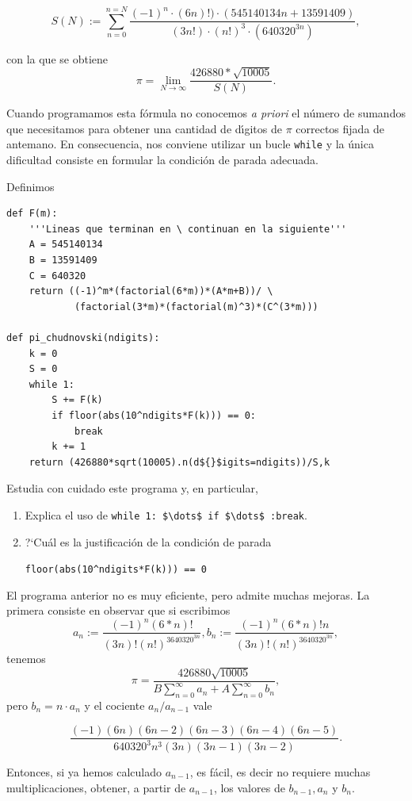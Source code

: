 \[S(N):=\sum_{n=0}^{n=N}\frac{(-1)^n\cdot (6n)!)\cdot
(545140134n+13591409)}{(3n!)\cdot (n!)^3\cdot (640320^{3n})},\]

\noindent con la que se obtiene 
\[\pi= \lim_{N\to \infty}\frac{426880*\sqrt{10005}}{S(N)}.\]

Cuando programamos esta f\'ormula no conocemos {\itshape a priori} el n\'umero
de sumandos que necesitamos para obtener una cantidad de d\'{\i}gitos de $\pi$
correctos fijada de antemano. En consecuencia, nos conviene utilizar un bucle
{\tt while} y la \'unica dificultad consiste en formular la condici\'on de
parada adecuada. 


Definimos

\begin{lstlisting}
def F(m):
	'''Lineas que terminan en \ continuan en la siguiente'''
    A = 545140134
    B = 13591409
    C = 640320
    return ((-1)^m*(factorial(6*m))*(A*m+B))/ \
		    (factorial(3*m)*(factorial(m)^3)*(C^(3*m)))
 
def pi_chudnovski(ndigits):
    k = 0
    S = 0 
    while 1:
        S += F(k)
        if floor(abs(10^ndigits*F(k))) == 0:
            break
        k += 1
    return (426880*sqrt(10005).n(d${}$igits=ndigits))/S,k
\end{lstlisting}

Estudia con cuidado este programa y, en particular, 
\begin{enumerate}
	\item Explica el uso de 
	\lstinline|while 1: $\dots$ if $\dots$ :break|.
\item ?`Cu\'al es la justificaci\'on
de la condici\'on de
parada  
\begin{center}
	\lstinline|floor(abs(10^ndigits*F(k))) == 0|
\end{center}

\end{enumerate}

El programa anterior no es muy eficiente, pero admite muchas mejoras. La primera
consiste en observar que si escribimos 
\[a_n:=\frac{(-1)^n(6*n)!}{(3n)!(n!)^3640320^{3n}},
b_n:=\frac{(-1)^n(6*n)!n}{(3n)!(n!)^3640320^{3n}},\]
\noindent tenemos 
\[\pi=\frac{426880\sqrt{10005}}{B\sum_{n=0}^{\infty}a_n+A\sum_{n=0}^{\infty}
b_n},\]
\noindent pero $b_n=n\cdot a_n$ y  el cociente $a_n/a_{n-1}$ vale 

\[
\frac{(-1)(6n)(6n-2)(6n-3)(6n-4)(6n-5)}{640320^3n^3(3n)(3n-1)(3n-2)}.
\]

Entonces, si ya hemos calculado $a_{n-1}$, es f\'acil, es decir no requiere muchas multiplicaciones, obtener,  a partir de $a_{n-1}$, los valores de $b_{n-1},a_n$ y $b_n$.




